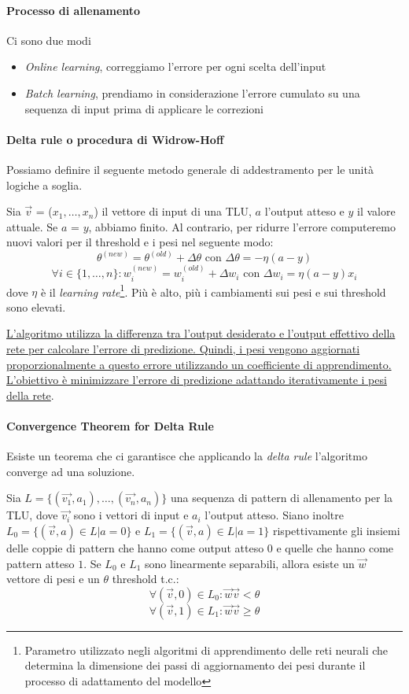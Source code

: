 \paragraph{Processo di allenamento} Ci sono due modi
\begin{itemize}
    \item \textit{Online learning}, correggiamo l’errore per ogni scelta dell’input
    \item \textit{Batch learning}, prendiamo in considerazione l’errore cumulato su una sequenza di input prima di applicare le correzioni
\end{itemize}

\paragraph{Delta rule o procedura di Widrow-Hoff}
Possiamo definire il seguente metodo generale di addestramento per le unità logiche a soglia.

Sia $\vec{v}$ = ($x_1, \dots, x_n$) il vettore di input di una TLU, $a$ l'output atteso e $y$ il valore attuale. Se $a$ = $y$, abbiamo finito. Al contrario, per ridurre l'errore computeremo nuovi valori per il threshold e i pesi nel seguente modo:
$$
\theta^{(new)} = \theta^{(old)} + \Delta\theta \text{ con } \Delta\theta = -\eta(a - y)
$$
$$
\forall i \in \{1, \dots, n\}:w_i^{(new)} = w_i^{(old)} + \Delta w_i \text{ con } \Delta w_i = \eta(a - y)x_i
$$
dove $\eta$ è il \textit{learning rate}\footnote{Parametro utilizzato negli algoritmi di apprendimento delle reti neurali che determina la dimensione dei passi di aggiornamento dei pesi durante il processo di adattamento del modello}. Più è alto, più i cambiamenti sui pesi e sui threshold sono elevati.

\uline{L'algoritmo utilizza la differenza tra l'output desiderato e l'output effettivo della rete per calcolare l'errore di predizione. Quindi, i pesi vengono aggiornati proporzionalmente a questo errore utilizzando un coefficiente di apprendimento. L'obiettivo è minimizzare l'errore di predizione adattando iterativamente i pesi della rete}.

\paragraph{Convergence Theorem for Delta Rule}
Esiste un teorema che ci garantisce che applicando la \textit{delta rule} l’algoritmo converge ad una soluzione.

Sia $L = \{(\vec{v_1},a_1), \dots, (\vec{v_n},a_n)\}$ una sequenza di pattern di allenamento per la TLU, dove $\vec{v_i}$ sono i vettori di input e $a_i$ l'output atteso. 
Siano inoltre $L_0 = \{(\vec{v},a) \in L | a = 0\}$ e $L_1 = \{(\vec{v},a) \in L | a = 1\}$ rispettivamente gli insiemi delle coppie di pattern che hanno come output atteso $0$ e quelle che hanno come pattern atteso $1$. Se $L_0$ e $L_1$ sono linearmente separabili, allora esiste un $\vec{w}$ vettore di pesi e un $\theta$ threshold t.c.:
$$
\forall (\vec{v},0) \in L_0: \vec{w}\vec{v} < \theta 
$$
$$
\forall (\vec{v},1) \in L_1: \vec{w}\vec{v} \geq \theta
$$


